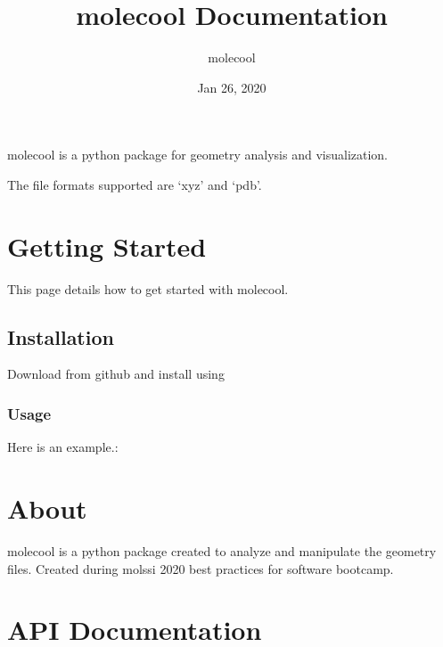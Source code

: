 \documentclass[letterpaper,10pt,english]{sphinxmanual}
\title{molecool Documentation}
\date{Jan 26, 2020}
\author{molecool}
\begin{document}
\pagestyle{empty}
\sphinxmaketitle
\pagestyle{plain}
\sphinxtableofcontents
\pagestyle{normal}
\label{\detokenize{index::doc}}


molecool is a python package for geometry analysis and visualization.

The file formats supported are ‘xyz’ and ‘pdb’.


\chapter{Getting Started}
\label{\detokenize{getting_started:getting-started}}\label{\detokenize{getting_started::doc}}
This page details how to get started with molecool.


\section{Installation}
\label{\detokenize{getting_started:installation}}
Download from github and install using



\subsection{Usage}
\label{\detokenize{getting_started:usage}}
Here is an example.:

\begin{sphinxVerbatim}[commandchars=\\\{\}]
 

   
\end{sphinxVerbatim}


\chapter{About}
\label{\detokenize{about:about}}\label{\detokenize{about::doc}}
molecool is a python package created to analyze and manipulate the geometry files. Created during molssi 2020 best practices for software bootcamp.


\chapter{API Documentation}
\label{\detokenize{api:api-documentation}}\label{\detokenize{api::doc}}
\end{document}
